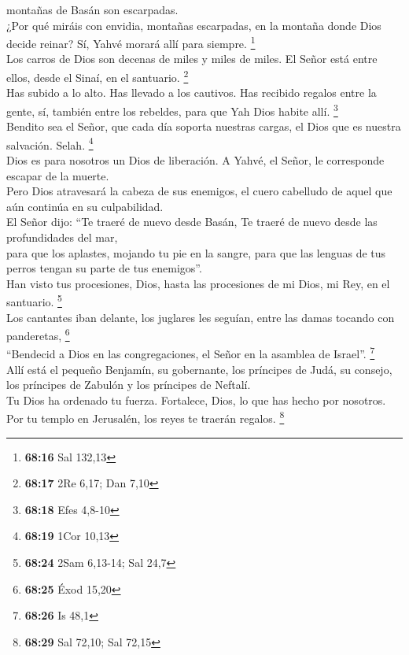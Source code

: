 montañas de Basán son escarpadas.\\
 ¿Por qué miráis con envidia, montañas escarpadas, en la
montaña donde Dios decide reinar? Sí, Yahvé morará allí para siempre.
\footnote{\textbf{68:16} Sal 132,13}\\
 Los carros de Dios son decenas de miles y miles de
miles. El Señor está entre ellos, desde el Sinaí, en el santuario.
\footnote{\textbf{68:17} 2Re 6,17; Dan 7,10}\\
 Has subido a lo alto. Has llevado a los cautivos. Has
recibido regalos entre la gente, sí, también entre los rebeldes, para
que Yah Dios habite allí. \footnote{\textbf{68:18} Efes 4,8-10}\\
 Bendito sea el Señor, que cada día soporta nuestras
cargas, el Dios que es nuestra salvación. Selah. \footnote{\textbf{68:19}
  1Cor 10,13}\\
 Dios es para nosotros un Dios de liberación. A Yahvé, el
Señor, le corresponde escapar de la muerte.\\
 Pero Dios atravesará la cabeza de sus enemigos, el cuero
cabelludo de aquel que aún continúa en su culpabilidad.\\
 El Señor dijo: ``Te traeré de nuevo desde Basán, Te
traeré de nuevo desde las profundidades del mar,\\
 para que los aplastes, mojando tu pie en la sangre, para
que las lenguas de tus perros tengan su parte de tus enemigos''.\\
 Han visto tus procesiones, Dios, hasta las procesiones
de mi Dios, mi Rey, en el santuario. \footnote{\textbf{68:24} 2Sam
  6,13-14; Sal 24,7}\\
 Los cantantes iban delante, los juglares les seguían,
entre las damas tocando con panderetas, \footnote{\textbf{68:25} Éxod
  15,20}\\
 ``Bendecid a Dios en las congregaciones, el Señor en la
asamblea de Israel''. \footnote{\textbf{68:26} Is 48,1}\\
 Allí está el pequeño Benjamín, su gobernante, los
príncipes de Judá, su consejo, los príncipes de Zabulón y los príncipes
de Neftalí.\\
 Tu Dios ha ordenado tu fuerza. Fortalece, Dios, lo que
has hecho por nosotros.\\
 Por tu templo en Jerusalén, los reyes te traerán
regalos. \footnote{\textbf{68:29} Sal 72,10; Sal 72,15}\\

